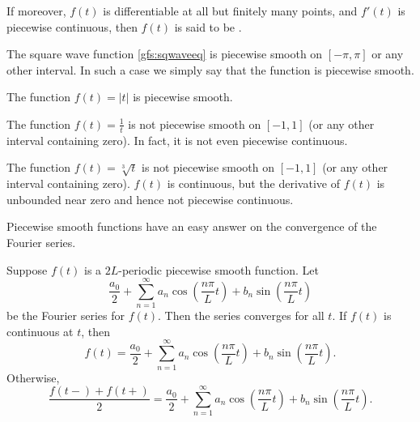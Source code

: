 If moreover, $f(t)$ is differentiable at all but finitely many points,
and $f'(t)$ is piecewise continuous, then 
$f(t)$ is said to be \emph{}.

\begin{example}
The square wave function \eqref{gfs:sqwaveeq}
is piecewise smooth on $[-\pi,\pi]$ or any other interval.  In such a
case we simply say that the function is piecewise smooth.
\end{example}

\begin{example}
The function $f(t) = \lvert t \lvert$
is piecewise smooth.
\end{example}

\begin{example}
The function $f(t) = \frac{1}{t}$ is not piecewise smooth on
$[-1,1]$ (or any other interval containing zero).  In fact, it is not
even piecewise continuous.
\end{example}

\begin{example}
The function $f(t) = \sqrt[3]{t}$ is not piecewise smooth on
$[-1,1]$ (or any other interval containing zero).  $f(t)$ is continuous, but
the derivative of $f(t)$ is unbounded near zero and hence not piecewise
continuous.
\end{example}

Piecewise smooth functions have an easy answer on the convergence
of the Fourier series.

\begin{theorem}
Suppose $f(t)$ is a $2L$-periodic piecewise smooth function.
Let
\begin{equation*}
\frac{a_0}{2} + \sum_{n=1}^\infty a_n \cos \left( \frac{n \pi}{L} t
\right)
+ b_n \sin \left( \frac{n \pi}{L} t \right)
\end{equation*}
be the Fourier series for $f(t)$.  Then the series converges
for all $t$.  If $f(t)$ is continuous
at $t$, then
\begin{equation*}
f(t) = \frac{a_0}{2} + \sum_{n=1}^\infty
a_n \cos \left( \frac{n \pi}{L} t \right)
+ b_n \sin \left( \frac{n \pi}{L} t \right) .
\end{equation*}
Otherwise,
\begin{equation*}
\frac{f(t-)+f(t+)}{2} =
\frac{a_0}{2} + \sum_{n=1}^\infty a_n \cos \left( \frac{n \pi}{L}  t
\right)
+ b_n \sin \left( \frac{n \pi}{L} t \right) .
\end{equation*}
\end{theorem}

